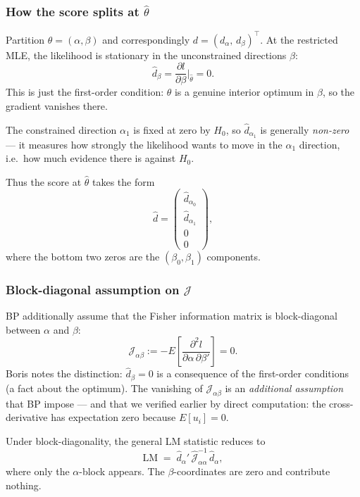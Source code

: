 \documentclass[a4paper,oneside,12pt]{extarticle}
\theoremstyle{plain}
\theoremstyle{definition}
\theoremstyle{remark}
\begin{document}
\subsubsection*{How the score splits at $\hat\theta$}

Partition $\theta = (\alpha, \beta)$ and correspondingly
$d = (d_\alpha,\, d_\beta)^\top$.  At the restricted MLE,
the likelihood is stationary in the unconstrained directions $\beta$:
\[
  \hat{d}_\beta
  = \frac{\partial l}{\partial\beta}\bigg|_{\hat\theta} = 0.
\]
This is just the first-order condition: $\hat\theta$ is a genuine
interior optimum in $\beta$, so the gradient vanishes there.

The constrained direction $\alpha_1$ is fixed at zero by $H_0$, so
$\hat{d}_{\alpha_1}$ is generally \emph{non-zero} — it measures
how strongly the likelihood wants to move in the $\alpha_1$
direction, i.e.\ how much evidence there is against $H_0$.

Thus the score at $\hat\theta$ takes the form
\[
  \hat{d}
  = \begin{pmatrix} \hat{d}_{\alpha_0} \\[2pt]
    \hat{d}_{\alpha_1} \\[2pt] 0 \\[2pt] 0 \end{pmatrix},
\]
where the bottom two zeros are the $(\beta_0,\beta_1)$ components.

\subsubsection*{Block-diagonal assumption on $\mathcal{J}$}

BP additionally assume that the Fisher information matrix is
block-diagonal between $\alpha$ and $\beta$:
\[
  \mathcal{J}_{\alpha\beta}
  := -E\!\left[\frac{\partial^2 l}{\partial\alpha\,\partial\beta'}\right]
  = 0.
\]
Boris notes the distinction: $\hat{d}_\beta = 0$ is a consequence
of the first-order conditions (a fact about the optimum).  The
vanishing of $\mathcal{J}_{\alpha\beta}$ is an \emph{additional
assumption} that BP impose — and that we verified earlier by direct
computation: the cross-derivative has expectation zero because
$E[u_i] = 0$.

Under block-diagonality, the general LM statistic reduces to
\[
  \boxed{\mathrm{LM}
  \;=\; \hat{d}_\alpha'\,\hat{\mathcal{J}}_{\alpha\alpha}^{-1}\,
  \hat{d}_\alpha,}
\]
where only the $\alpha$-block appears.  The $\beta$-coordinates
are zero and contribute nothing.
\end{document}
